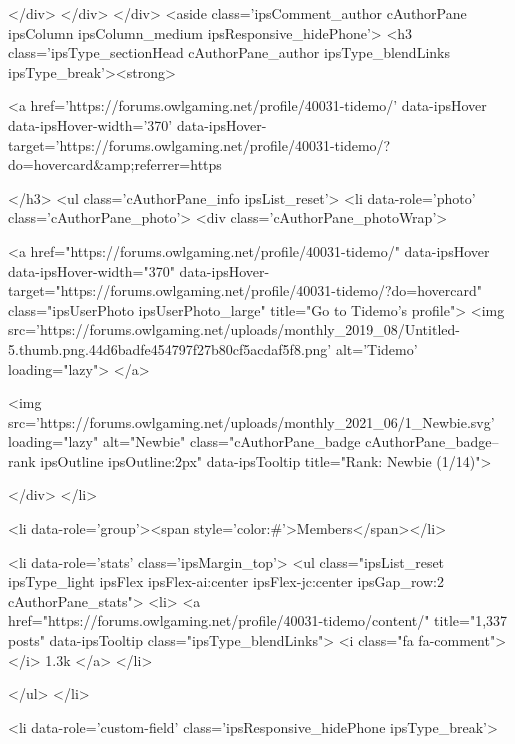 			</div>
		</div>
	</div>
	<aside class='ipsComment_author cAuthorPane ipsColumn ipsColumn_medium ipsResponsive_hidePhone'>
		<h3 class='ipsType_sectionHead cAuthorPane_author ipsType_blendLinks ipsType_break'><strong>


<a href='https://forums.owlgaming.net/profile/40031-tidemo/' data-ipsHover data-ipsHover-width='370' data-ipsHover-target='https://forums.owlgaming.net/profile/40031-tidemo/?do=hovercard&amp;referrer=https%
			
		</h3>
		<ul class='cAuthorPane_info ipsList_reset'>
			<li data-role='photo' class='cAuthorPane_photo'>
				<div class='cAuthorPane_photoWrap'>
					


	<a href="https://forums.owlgaming.net/profile/40031-tidemo/" data-ipsHover data-ipsHover-width="370" data-ipsHover-target="https://forums.owlgaming.net/profile/40031-tidemo/?do=hovercard" class="ipsUserPhoto ipsUserPhoto_large" title="Go to Tidemo's profile">
		<img src='https://forums.owlgaming.net/uploads/monthly_2019_08/Untitled-5.thumb.png.44d6badfe454797f27b80cf5acdaf5f8.png' alt='Tidemo' loading="lazy">
	</a>

					
					
						
<img src='https://forums.owlgaming.net/uploads/monthly_2021_06/1_Newbie.svg' loading="lazy" alt="Newbie" class="cAuthorPane_badge cAuthorPane_badge--rank ipsOutline ipsOutline:2px" data-ipsTooltip title="Rank: Newbie (1/14)">
					
				</div>
			</li>
			
				<li data-role='group'><span style='color:#'>Members</span></li>
				
			
			
				<li data-role='stats' class='ipsMargin_top'>
					<ul class="ipsList_reset ipsType_light ipsFlex ipsFlex-ai:center ipsFlex-jc:center ipsGap_row:2 cAuthorPane_stats">
						<li>
							<a href="https://forums.owlgaming.net/profile/40031-tidemo/content/" title="1,337 posts" data-ipsTooltip class="ipsType_blendLinks">
								<i class="fa fa-comment"></i> 1.3k
							</a>
						</li>
						
					</ul>
				</li>
			
			
				

	
	<li data-role='custom-field' class='ipsResponsive_hidePhone ipsType_break'>
		
